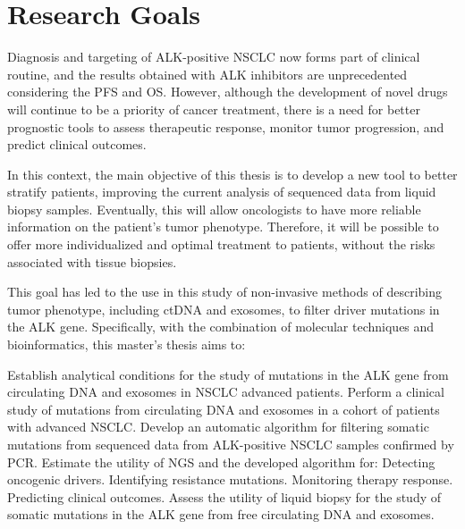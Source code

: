 \chapter{Research Goals}

Diagnosis and targeting of ALK-positive NSCLC now forms part of clinical routine, and the results obtained with ALK inhibitors are unprecedented considering the PFS and OS. However, although the development of novel drugs will continue to be a priority of cancer treatment, there is a need for better prognostic tools to assess therapeutic response, monitor tumor progression, and predict clinical outcomes.

In this context, the main objective of this thesis is to develop a new tool to better stratify patients, improving the current analysis of sequenced data from liquid biopsy samples. Eventually, this will allow oncologists to have more reliable information on the patient's tumor phenotype. Therefore, it will be possible to offer more individualized and optimal treatment to patients, without the risks associated with tissue biopsies.

This goal has led to the use in this study of non-invasive methods of describing tumor phenotype, including ctDNA and exosomes, to filter driver mutations in the ALK gene. Specifically, with the combination of molecular techniques and bioinformatics, this master's thesis aims to:
\begin{outline}
    \1 Establish analytical conditions for the study of mutations in the ALK gene from circulating DNA and exosomes in NSCLC advanced patients.
    \1 Perform a clinical study of mutations from circulating DNA and exosomes in a cohort of patients with advanced NSCLC.
    \1 Develop an automatic algorithm for filtering somatic mutations from sequenced data from ALK-positive NSCLC samples confirmed by PCR.
    \1 Estimate the utility of NGS and the developed algorithm for:
        \2 Detecting oncogenic drivers.
        \2 Identifying resistance mutations.
        \2 Monitoring therapy response.
        \2 Predicting clinical outcomes.
    \1 Assess the utility of liquid biopsy for the study of somatic mutations in the ALK gene from free circulating DNA and exosomes.
\end{outline}

